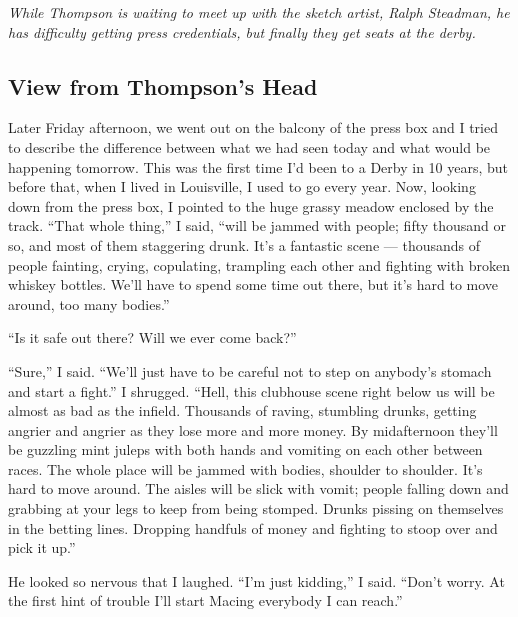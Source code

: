 \documentclass[10pt,a4paper]{article}
\newcommand{\editorsnote}[1]{%
		\begin{list}{}{%
			\setlength{\leftmargin}{3em}%
			\setlength{\rightmargin}{3em}%
		}%
		\item\relax\small\plantin\itshape\color{hgblue}#1%
		\end{list}%
	}
\begin{document}
\newpage

\editorsnote{While Thompson is waiting to meet up with the sketch artist, Ralph Steadman, he has difficulty getting press credentials, but finally they get seats at the derby.}

\subsection{View from Thompson’s Head}
Later Friday afternoon, we went out on the balcony of the press box and I tried to describe the difference between what we had seen today and what would be happening tomorrow. This was the first time I’d been to a Derby in 10 years, but before that, when I lived in Louisville, I used to go every year. Now, looking down from the press box, I pointed to the huge grassy meadow enclosed by the track. “That whole thing,” I said, “will be jammed with people; fifty thousand or so, and most of them staggering drunk. It’s a fantastic scene — thousands of people fainting, crying, copulating, trampling each other and fighting with broken whiskey bottles. We’ll have to spend some time out there, but it’s hard to move around, too many bodies.”

“Is it safe out there? Will we ever come back?”

“Sure,” I said. “We’ll just have to be careful not to step on anybody’s stomach and start a fight.” I shrugged. “Hell, this clubhouse scene right below us will be almost as bad as the infield. Thousands of raving, stumbling drunks, getting angrier and angrier as they lose more and more money. By midafternoon they’ll be guzzling mint juleps with both hands and vomiting on each other between races. The whole place will be jammed with bodies, shoulder to shoulder. It’s hard to move around. The aisles will be slick with vomit; people falling down and grabbing at your legs to keep from being stomped. Drunks pissing on themselves in the betting lines. Dropping handfuls of money and fighting to stoop over and pick it up.”

He looked so nervous that I laughed. “I’m just kidding,” I said. “Don’t worry. At the first hint of trouble I’ll start Macing everybody I can reach.”
\end{document}
